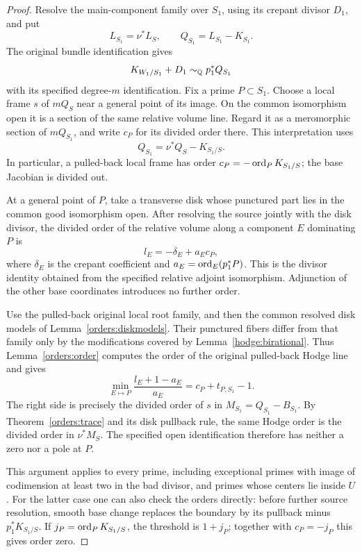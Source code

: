 \begin{proof}
Resolve the main-component family over \(S_1\), using its crepant
divisor \(D_1\), and put
\[
 L_{S_1}=\nu^*L_S,\qquad
 Q_{S_1}=L_{S_1}-K_{S_1}.
\]
The original bundle identification gives
\[
                    K_{W_1/S_1}+D_1
                    \sim_{\mathbb Q}p_1^*Q_{S_1}
\]
with its specified degree-\(m\) identification.
Fix a prime \(P\subset S_1\).  Choose a local frame \(s\) of
\(mQ_S\) near a general point of its image.  On the common
isomorphism open it is a section of the same relative volume
line.  Regard it as a meromorphic section of \(mQ_{S_1}\), and
write \(c_P\) for its divided order there.  This interpretation
uses
\begin{equation}
                 Q_{S_1}=\nu^*Q_S-K_{S_1/S}.
 \label{orders:basejacobian}
\end{equation}
In particular, a pulled-back local frame has order
\(c_P=-\operatorname{ord}_P K_{S_1/S}\); the base Jacobian is divided out.

At a general point of \(P\), take a transverse disk whose
punctured part lies in the common good isomorphism open.
After resolving the source jointly with the disk divisor,
the divided order of the relative volume along a component
\(E\) dominating \(P\) is
\begin{equation}
                     l_E=-\delta_E+a_Ec_P,
 \label{orders:higherorders}
\end{equation}
where \(\delta_E\) is the crepant coefficient and
\(a_E=\operatorname{ord}_E(p_1^*P)\).  This is the divisor identity obtained
from the specified relative adjoint isomorphism.  Adjunction of
the other base coordinates introduces no further order.

Use the pulled-back original local root family, and then the
common resolved disk models of
Lemma~\ref{orders:diskmodels}.  Their punctured fibers differ
from that family only by the modifications covered by
Lemma~\ref{hodge:birational}.  Thus
Lemma~\ref{orders:order} computes the order of the original
pulled-back Hodge line and gives
\[
 \min_{E\mapsto P}\frac{l_E+1-a_E}{a_E}
       =c_P+t_{P,S_1}-1.
\]
The right side is precisely the divided order of \(s\) in
\(M_{S_1}=Q_{S_1}-B_{S_1}\).
By Theorem~\ref{orders:trace} and its disk pullback rule, the
same Hodge order is the divided order in \(\nu^*M_S\).
The specified open identification therefore has neither a zero
nor a pole at \(P\).

This argument applies to every prime, including exceptional
primes with image of codimension at least two in the bad
divisor, and primes whose centers lie inside \(U\).
For the latter case one can also check the orders directly:
before further source resolution, smooth base change replaces
the boundary by its pullback minus \(p_1^*K_{S_1/S}\).
If \(j_P=\operatorname{ord}_P K_{S_1/S}\), the threshold is \(1+j_P\);
together with \(c_P=-j_P\) this gives order zero.


\end{proof}
